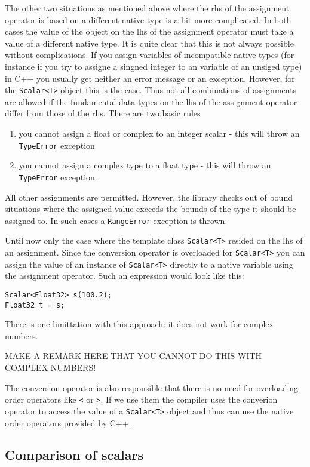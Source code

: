 The other two situations as mentioned above where the rhs of the assignment 
operator is based on a different native type is a bit more complicated. 
In both cases the value of the object on the lhs of the assignment operator 
must take a value of a different native type. It is quite clear that this is 
not always possible without complications. If you assign variables of 
incompatible native types (for instance if you try to assigne a singned integer
to an variable of an unsiged type) in C++ you usually get neither an error
message or an exception. However, for the {\tt Scalar<T>} object this is the 
case. Thus not all combinations of assignments are allowed if the fundamental 
data types on the lhs of the assignment operator differ from those of the 
rhs.
There are two basic rules
\begin{enumerate}
  \item you cannot assign a float or complex to an integer scalar - this will
  throw an {\tt TypeError} exception
  \item you cannot assign a complex type to a float type - this will throw
  an {\tt TypeError} exception.
\end{enumerate}
All other assignments are permitted. However, the library checks out of 
bound situations where the assigned value exceeds the bounds of the 
type it should be assigned to. In such cases a {\tt RangeError} exception 
is thrown. 

Until now only the case where the template class {\tt Scalar<T>} resided on 
the lhs of an assignment. Since the conversion operator is overloaded 
for {\tt Scalar<T>} you can assign the value of an instance of {\tt Scalar<T>}
directly to a native variable using the assignment operator. 
Such an expression would look like this:
\begin{verbatim}
Scalar<Float32> s(100.2);
Float32 t = s;
\end{verbatim}
There is one limittation with this approach: it does not work for 
complex numbers. 
\begin{center}
{\HUGE MAKE A REMARK HERE THAT YOU CANNOT DO THIS WITH COMPLEX NUMBERS!}
\end{center}
The conversion operator is also responsible that there is 
no need for overloading order operators like {\tt <} or {\tt >}. If 
we use them the compiler uses the converion operator to access the value of 
a {\tt Scalar<T>} object and thus can use the native order operators provided 
by C++.  

\subsection{Comparison of scalars}


